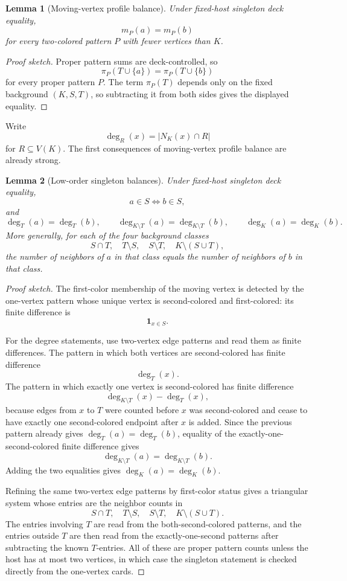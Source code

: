 \documentclass[11pt]{article}
\newtheorem{lemma}{Lemma}
\newcommand{\one}{\mathbf{1}}
\begin{document}
\begin{lemma}[Moving-vertex profile balance]
Under fixed-host singleton deck equality,
\[
  m_P(a)=m_P(b)
\]
for every two-colored pattern \(P\) with fewer vertices than \(K\).
\end{lemma}

\begin{proof}[Proof sketch]
Proper pattern sums are deck-controlled, so
\[
  \pi_P(T\cup\{a\})=\pi_P(T\cup\{b\})
\]
for every proper pattern \(P\).  The term \(\pi_P(T)\) depends only on the
fixed background \((K,S,T)\), so subtracting it from both sides gives the
displayed equality.
\end{proof}

Write
\[
  \deg_R(x)=|N_K(x)\cap R|
\]
for \(R\subseteq V(K)\).  The first consequences of moving-vertex profile
balance are already strong.

\begin{lemma}[Low-order singleton balances]
Under fixed-host singleton deck equality,
\[
  a\in S \Longleftrightarrow b\in S,
\]
and
\[
  \deg_T(a)=\deg_T(b),
  \qquad
  \deg_{K\setminus T}(a)=\deg_{K\setminus T}(b),
  \qquad
  \deg_K(a)=\deg_K(b).
\]
More generally, for each of the four background classes
\[
  S\cap T,\quad T\setminus S,\quad S\setminus T,\quad
  K\setminus(S\cup T),
\]
the number of neighbors of \(a\) in that class equals the number of neighbors
of \(b\) in that class.
\end{lemma}

\begin{proof}[Proof sketch]
The first-color membership of the moving vertex is detected by the
one-vertex pattern whose unique vertex is second-colored and first-colored:
its finite difference is
\[
  \one_{x\in S}.
\]

For the degree statements, use two-vertex edge patterns and read them as
finite differences.  The pattern in which both vertices are second-colored
has finite difference
\[
  \deg_T(x).
\]
The pattern in which exactly one vertex is second-colored has finite
difference
\[
  \deg_{K\setminus T}(x)-\deg_T(x),
\]
because edges from \(x\) to \(T\) were counted before \(x\) was
second-colored and cease to have exactly one second-colored endpoint after
\(x\) is added.  Since the previous pattern already gives
\(\deg_T(a)=\deg_T(b)\), equality of the exactly-one-second-colored finite
difference gives
\[
  \deg_{K\setminus T}(a)=\deg_{K\setminus T}(b).
\]
Adding the two equalities gives \(\deg_K(a)=\deg_K(b)\).

Refining the same two-vertex edge patterns by first-color status gives a
triangular system whose entries are the neighbor counts in
\[
  S\cap T,\quad T\setminus S,\quad S\setminus T,\quad
  K\setminus(S\cup T).
\]
The entries involving \(T\) are read from the both-second-colored patterns,
and the entries outside \(T\) are then read from the exactly-one-second
patterns after subtracting the known \(T\)-entries.  All of these are proper
pattern counts unless the host has at most two vertices, in which case the
singleton statement is checked directly from the one-vertex cards.
\end{proof}
\end{document}
